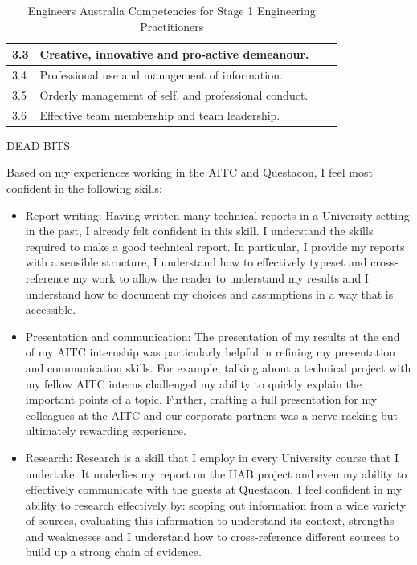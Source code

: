 \documentclass[11pt]{article}
\newenvironment{localsize}[1]
{%
  \clearpage
  \let\orignewcommand\newcommand
  \let\newcommand\renewcommand
  \makeatletter
  \makeatother
  \let\newcommand\orignewcommand
}
{%
  \clearpage
}
\begin{document}
\begin{localsize}{10}
\begin{table}[!h]
\begin{tabular}{|p{0.75cm} | p{8cm} | p{1.5cm} | p{2cm} |}
   3.3 & Creative, innovative and pro-active demeanour. & & \\ \hline
   3.4 & Professional use and management of information. & & \\ \hline
   3.5 & Orderly management of self, and professional conduct. & & \\ \hline
   3.6 & Effective team membership and team leadership. & & \\ \hline
   \end{tabular}  
\caption{Engineers Australia Competencies for Stage 1 Engineering Practitioners}
\end{table}

\end{localsize}

DEAD BITS

Based on my experiences working in the AITC and Questacon, I feel most confident in the following skills:

\begin{itemize}

\item Report writing: Having written many technical reports in a University setting in the past, I already felt confident in this skill. I understand the skills required to make a good technical report. In particular, I provide my reports with a sensible structure, I understand how to effectively typeset and cross-reference my work to allow the reader to understand my results and I understand how to document my choices and assumptions in a way that is accessible.

\item Presentation and communication: The presentation of my results at the end of my AITC internship was particularly helpful in refining my presentation and communication skills. For example, talking about a technical project with my fellow AITC interns challenged my ability to quickly explain the important points of a topic. Further, crafting a full presentation for my colleagues at the AITC and our corporate partners was a nerve-racking but ultimately rewarding experience. 

\item Research: Research is a skill that I employ in every University course that I undertake. It underlies my report on the HAB project and even my ability to effectively communicate with the guests at Questacon. I feel confident in my ability to research effectively by: scoping out information from a wide variety of sources, evaluating this information to understand its context, strengths and weaknesses and I understand how to cross-reference different sources to build up a strong chain of evidence. 

\end{itemize}
\end{document}
